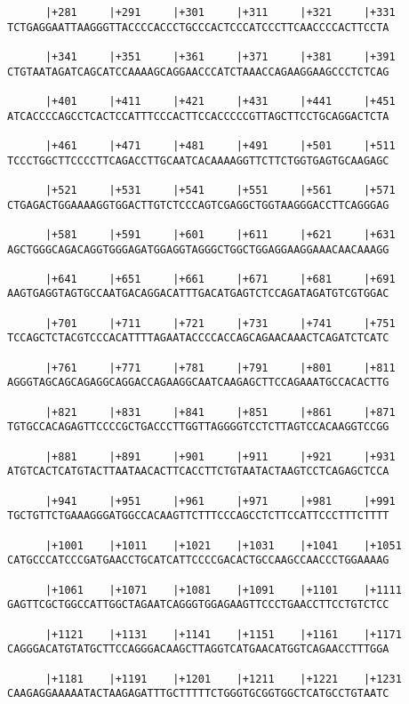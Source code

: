 \documentclass{article}
\begin{document}
\begin{Verbatim}
      |+281     |+291     |+301     |+311     |+321     |+331
TCTGAGGAATTAAGGGTTACCCCACCCTGCCCACTCCCATCCCTTCAACCCCACTTCCTA

      |+341     |+351     |+361     |+371     |+381     |+391
CTGTAATAGATCAGCATCCAAAAGCAGGAACCCATCTAAACCAGAAGGAAGCCCTCTCAG

      |+401     |+411     |+421     |+431     |+441     |+451
ATCACCCCAGCCTCACTCCATTTCCCACTTCCACCCCCGTTAGCTTCCTGCAGGACTCTA

      |+461     |+471     |+481     |+491     |+501     |+511
TCCCTGGCTTCCCCTTCAGACCTTGCAATCACAAAAGGTTCTTCTGGTGAGTGCAAGAGC

      |+521     |+531     |+541     |+551     |+561     |+571
CTGAGACTGGAAAAGGTGGACTTGTCTCCCAGTCGAGGCTGGTAAGGGACCTTCAGGGAG

      |+581     |+591     |+601     |+611     |+621     |+631
AGCTGGGCAGACAGGTGGGAGATGGAGGTAGGGCTGGCTGGAGGAAGGAAACAACAAAGG

      |+641     |+651     |+661     |+671     |+681     |+691
AAGTGAGGTAGTGCCAATGACAGGACATTTGACATGAGTCTCCAGATAGATGTCGTGGAC

      |+701     |+711     |+721     |+731     |+741     |+751
TCCAGCTCTACGTCCCACATTTTAGAATACCCCACCAGCAGAACAAACTCAGATCTCATC

      |+761     |+771     |+781     |+791     |+801     |+811
AGGGTAGCAGCAGAGGCAGGACCAGAAGGCAATCAAGAGCTTCCAGAAATGCCACACTTG

      |+821     |+831     |+841     |+851     |+861     |+871
TGTGCCACAGAGTTCCCCGCTGACCCTTGGTTAGGGGTCCTCTTAGTCCACAAGGTCCGG

      |+881     |+891     |+901     |+911     |+921     |+931
ATGTCACTCATGTACTTAATAACACTTCACCTTCTGTAATACTAAGTCCTCAGAGCTCCA

      |+941     |+951     |+961     |+971     |+981     |+991
TGCTGTTCTGAAAGGGATGGCCACAAGTTCTTTCCCAGCCTCTTCCATTCCCTTTCTTTT

      |+1001    |+1011    |+1021    |+1031    |+1041    |+1051
CATGCCCATCCCGATGAACCTGCATCATTCCCCGACACTGCCAAGCCAACCCTGGAAAAG

      |+1061    |+1071    |+1081    |+1091    |+1101    |+1111
GAGTTCGCTGGCCATTGGCTAGAATCAGGGTGGAGAAGTTCCCTGAACCTTCCTGTCTCC

      |+1121    |+1131    |+1141    |+1151    |+1161    |+1171
CAGGGACATGTATGCTTCCAGGGACAAGCTTAGGTCATGAACATGGTCAGAACCTTTGGA

      |+1181    |+1191    |+1201    |+1211    |+1221    |+1231
CAAGAGGAAAAATACTAAGAGATTTGCTTTTTCTGGGTGCGGTGGCTCATGCCTGTAATC


\end{Verbatim}
\end{document}
